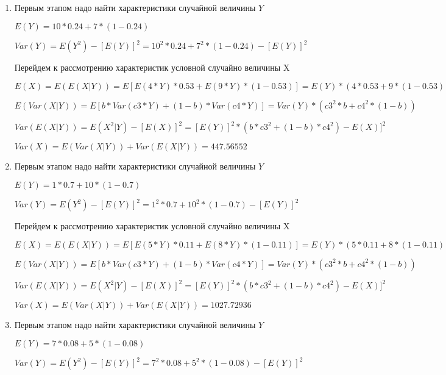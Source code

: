 \documentclass[a4paper,12pt]{article}
\begin{document}
\begin{enumerate}
\item

	

	Первым этапом надо найти характеристики случайной величины $Y$

	$E(Y) = 10 * 0.24 + 7 * (1 - 0.24)$

	$Var(Y) = E(Y^2) - [E(Y)]^2 = 10^2 * 0.24 + 7^2 * (1 - 0.24) - [E(Y)]^2$


	Перейдем к рассмотрению характеристик условной случайно величины X

	$E(X) = E(E(X|Y)) = E[E(4 * Y) * 0.53 + E(9 * Y) * (1 - 0.53)] = E(Y) * (4 * 0.53 + 9 * (1 - 0.53)) = 49.022$

	$E(Var(X|Y)) = E[b * Var(c3 * Y) + (1 - b) * Var(c4 * Y)] = Var(Y) * (c3^2 * b + c4^2 * (1- b)) $

	$Var(E(X|Y)) = E(X^2|Y) - [E(X)]^2 = [E(Y)]^2 * (b * c3^2 + (1-b)*c4^2) - E(X)]^2$

	$Var(X) = E(Var(X|Y)) + Var(E(X|Y)) = 447.56552$
	


\item

	

	Первым этапом надо найти характеристики случайной величины $Y$

	$E(Y) = 1 * 0.7 + 10 * (1 - 0.7)$

	$Var(Y) = E(Y^2) - [E(Y)]^2 = 1^2 * 0.7 + 10^2 * (1 - 0.7) - [E(Y)]^2$


	Перейдем к рассмотрению характеристик условной случайно величины X

	$E(X) = E(E(X|Y)) = E[E(5 * Y) * 0.11 + E(8 * Y) * (1 - 0.11)] = E(Y) * (5 * 0.11 + 8 * (1 - 0.11)) = 28.379$

	$E(Var(X|Y)) = E[b * Var(c3 * Y) + (1 - b) * Var(c4 * Y)] = Var(Y) * (c3^2 * b + c4^2 * (1- b)) $

	$Var(E(X|Y)) = E(X^2|Y) - [E(X)]^2 = [E(Y)]^2 * (b * c3^2 + (1-b)*c4^2) - E(X)]^2$

	$Var(X) = E(Var(X|Y)) + Var(E(X|Y)) = 1027.72936$
	


\item

	

	Первым этапом надо найти характеристики случайной величины $Y$

	$E(Y) = 7 * 0.08 + 5 * (1 - 0.08)$

	$Var(Y) = E(Y^2) - [E(Y)]^2 = 7^2 * 0.08 + 5^2 * (1 - 0.08) - [E(Y)]^2$



\end{enumerate}
\end{document}
